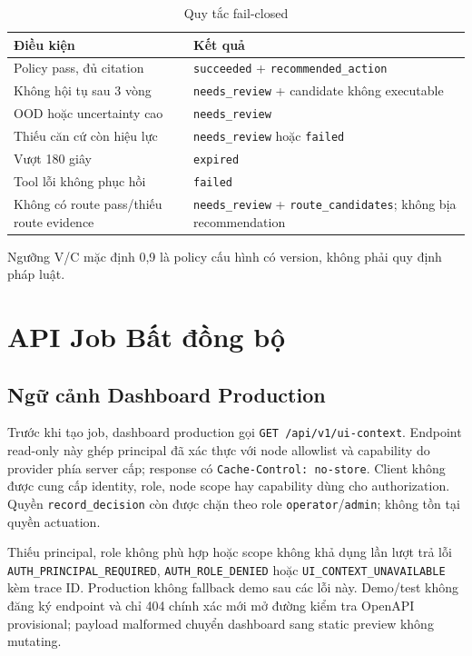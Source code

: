 \begin{table}[H]
\centering
\caption{Quy tắc fail-closed}
\begin{tabular}{p{6cm} p{7cm}}
\toprule
\textbf{Điều kiện} & \textbf{Kết quả} \\
\midrule
Policy pass, đủ citation & \texttt{succeeded} + \texttt{recommended\_action} \\
Không hội tụ sau 3 vòng & \texttt{needs\_review} + candidate không executable \\
OOD hoặc uncertainty cao & \texttt{needs\_review} \\
Thiếu căn cứ còn hiệu lực & \texttt{needs\_review} hoặc \texttt{failed} \\
Vượt 180 giây & \texttt{expired} \\
Tool lỗi không phục hồi & \texttt{failed} \\
Không có route pass/thiếu route evidence & \texttt{needs\_review} + \texttt{route\_candidates}; không bịa recommendation \\
\bottomrule
\end{tabular}
\end{table}

Ngưỡng V/C mặc định 0,9 là policy cấu hình có version, không phải quy định pháp luật.

\section{API Job Bất đồng bộ}

\subsection{Ngữ cảnh Dashboard Production}

Trước khi tạo job, dashboard production gọi
\texttt{GET /api/v1/ui-context}. Endpoint read-only này ghép principal đã xác
thực với node allowlist và capability do provider phía server cấp; response có
\texttt{Cache-Control: no-store}. Client không được cung cấp identity, role,
node scope hay capability dùng cho authorization. Quyền
\texttt{record\_decision} còn được chặn theo role
\texttt{operator}/\texttt{admin}; không tồn tại quyền actuation.

Thiếu principal, role không phù hợp hoặc scope không khả dụng lần lượt trả lỗi
\texttt{AUTH\_PRINCIPAL\_REQUIRED}, \texttt{AUTH\_ROLE\_DENIED} hoặc
\texttt{UI\_CONTEXT\_UNAVAILABLE} kèm trace ID. Production không fallback demo
sau các lỗi này. Demo/test không đăng ký endpoint và chỉ 404 chính xác mới mở
đường kiểm tra OpenAPI provisional; payload malformed chuyển dashboard sang
static preview không mutating.

